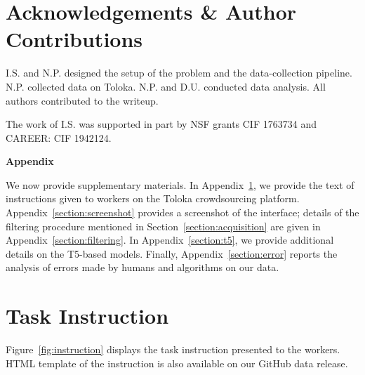 \documentclass{article}
\begin{document}
\section*{Acknowledgements \& Author Contributions}

I.S. and N.P. designed the setup of the problem and the data-collection pipeline. N.P. collected data on Toloka. N.P. and D.U. conducted data analysis. All authors contributed to the writeup.

The work of I.S. was supported in part by NSF grants CIF 1763734 and CAREER: CIF 1942124.




\newpage

\appendix

\textbf{\LARGE Appendix}

We now provide supplementary materials. In Appendix~\ref{section:task_instructions}, we provide the text of instructions given to workers on the Toloka crowdsourcing platform. Appendix~\ref{section:screenshot} provides a screenshot of the interface; details of the filtering procedure mentioned in Section~\ref{section:acquisition} are given in Appendix~\ref{section:filtering}. In Appendix~\ref{section:t5}, we provide additional details on the T5-based models. Finally, Appendix~\ref{section:error} reports the analysis of errors made by humans and algorithms on our data. 

\section{Task Instruction}
\label{section:task_instructions}

Figure~\ref{fig:instruction} displays the task instruction presented to the workers. HTML template of the instruction is also available on our GitHub data release.
\end{document}
